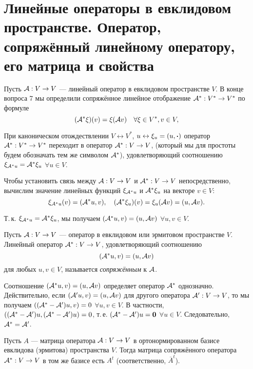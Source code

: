 \section{Линейные операторы в евклидовом пространстве. Оператор, сопряжённый линейному оператору, его матрица и свойства}

Пусть $\mathcal{A}: V \to V$ --- линейный оператор в евклидовом пространстве $V$. В конце вопроса 7 мы определили сопряжённое линейное отображение $\mathcal{A}^\ast: V^\ast \to V^\ast$ по формуле
\[
    (\mathcal{A}^\ast\xi)(v) = \xi(\mathcal{A} v)\quad\forall \xi \in V^\ast, v \in V,
\]

При каноническом отождествлении $V \leftrightarrow V^\ast$, $u \leftrightarrow \xi_u = (u, \boldsymbol{\cdot})$ оператор $\mathcal{A}^\ast: V^\ast \to V^\ast$ переходит в оператор $\mathcal{A}^\ast: V \to V$, (который мы для простоты будем обозначать тем же символом $\mathcal{A}^\ast$), удовлетворяющий соотношению $\xi_{\mathcal{A}^\ast u} = \mathcal{A}^\ast\xi_u$ $\forall u \in V$.

Чтобы установить связь между $\mathcal{A}: V \to V$ и $\mathcal{A}^\ast: V \to V$ непосредственно, вычислим значение линейных функций $\xi_{\mathcal{A}^\ast u}$ и $\mathcal{A}^\ast\xi_u$ на векторе $v \in V$:
\[
    \xi_{\mathcal{A}^\ast u}(v) = (\mathcal{A}^\ast u, v),\quad (\mathcal{A}^\ast\xi_u)(v) = \xi_u(\mathcal{A} v) = (u, \mathcal{A} v).
\]

Т.\,к. $\xi_{\mathcal{A}^\ast u} = \mathcal{A}^\ast\xi_u$, мы получаем $(\mathcal{A}^\ast u, v) = (u, \mathcal{A} v)$ $\forall u, v \in V$.

\begin{definition}
    Пусть $\mathcal{A}: V \to V$ --- оператор в евклидовом или эрмитовом пространстве $V$. Линейный оператор $\mathcal{A}^\ast: V \to V$, удовлетворяющий соотношению
    \[
        (\mathcal{A}^\ast u, v) = (u, \mathcal{A} v)
    \]
    для любых $u, v \in V$, называется \textit{сопряжённым} к $\mathcal{A}$.
\end{definition}

Соотношение $(\mathcal{A}^\ast u, v) = (u, \mathcal{A} v)$ определяет оператор $\mathcal{A}^\ast$ однозначно. Действительно, если $(\mathcal{A}^\prime u, v) = (u, \mathcal{A} v)$ для другого оператора $\mathcal{A}^\prime: V \to V$, то мы получаем $((\mathcal{A}^\ast - \mathcal{A}^\prime)u, v) = 0$ $\forall u, v \in V$. В частности, $((\mathcal{A}^\ast - \mathcal{A}^\prime)u, (\mathcal{A}^\ast - \mathcal{A}^\prime)u) = 0$, т.\,е. $(\mathcal{A}^\ast - \mathcal{A}^\prime)u = \boldsymbol{0}$ $\forall u \in V$. Следовательно, $\mathcal{A}^\ast = \mathcal{A}^\prime$.

\begin{proposal}
    Пусть $A$ --- матрица оператора $\mathcal{A}: V \to V$ в ортонормированном базисе евклидова (эрмитова) пространства $V$. Тогда матрица сопряжённого оператора $\mathcal{A}^\ast: V \to V$ в том же базисе есть $A^t$ (соответственно, $\overline{A}^t$).
\end{proposal}

